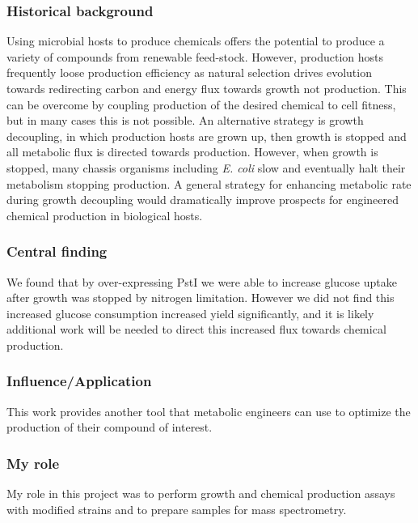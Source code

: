 \documentclass{article}
\begin{document}
\subsubsection{Historical background}
Using microbial hosts to produce chemicals offers the potential to produce a variety of compounds from renewable feed-stock.
However, production hosts frequently loose production efficiency as natural selection drives evolution towards redirecting carbon and energy flux towards growth not production.
This can be overcome by coupling production of the desired chemical to cell fitness, but in many cases this is not possible.
An alternative strategy is growth decoupling, in which production hosts are grown up, then growth is stopped and all metabolic flux is directed towards production.
However, when growth is stopped, many chassis organisms including \textit{E. coli} slow and eventually halt their metabolism stopping production.
A general strategy for enhancing metabolic rate during growth decoupling would dramatically improve prospects for engineered chemical production in biological hosts.
%
\subsubsection{Central finding}
We found that by over-expressing PstI we were able to increase glucose uptake after growth was stopped by nitrogen limitation. 
However we did not find this increased glucose consumption increased yield significantly, and it is likely additional work will be needed to direct this increased flux towards chemical production.
%
\subsubsection{Influence/Application}
This work provides another tool that metabolic engineers can use to optimize the production of their compound of interest.
%
\subsubsection{My role}
My role in this project was to perform growth and chemical production assays with modified strains and to prepare samples for mass spectrometry.
%
\nocite{Chubukov2017-uu}
\printbibliography[heading=none]

\end{document}

